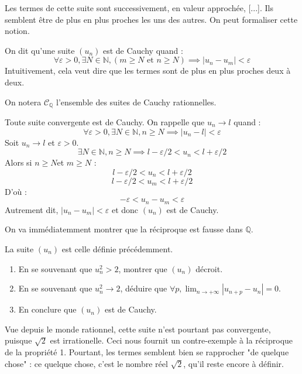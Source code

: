 Les termes de cette suite sont successivement, en valeur approchée, [...]. Ils semblent être de plus en plus proches les uns des autres. On peut formaliser cette notion.

\begin{defini}
On dit qu'une suite $(u_n)$ est de Cauchy quand :
$$\forall \varepsilon > 0, \exists N \in \mathbb{N}, (m \geq N \text{ et } n \geq N) \implies |u_n-u_m| < \varepsilon$$
Intuitivement, cela veut dire que les termes sont de plus en plus proches deux à deux.

On notera $\mathcal{C}_{\mathbb{Q}}$ l'ensemble des suites de Cauchy rationnelles.
\end{defini}

\begin{prop}
Toute suite convergente est de Cauchy.
\tcblower
On rappelle que $u_n \to l$ quand :
$$\forall \varepsilon > 0, \exists N \in \mathbb{N}, n \geq N \implies |u_n-l| < \varepsilon$$
Soit $u_n \to l$ et $\varepsilon > 0$.
$$\exists N \in \mathbb{N}, n \geq N \implies l-\varepsilon/2 < u_n < l+\varepsilon/2$$
Alors si $n \geq N$et $m \geq  N$ :
$$l-\varepsilon/2 < u_n < l+\varepsilon/2$$
$$l-\varepsilon/2 < u_m < l+\varepsilon/2$$
D'où :
$$-\varepsilon < u_n-u_m < \varepsilon$$
Autrement dit, $|u_n-u_m|<\varepsilon$ et donc $(u_n)$ est de Cauchy.
\end{prop}    

On va immédiatemment montrer que la réciproque est fausse dans $\mathbb{Q}$.

\begin{exo}
La suite $(u_n)$ est celle définie précédemment.
\begin{enumerate}[font=\color{blue!50!green}]
\item En se souvenant que $u_n^2>2$, montrer que $(u_n)$ décroit.
\item En se souvenant que $u_n^2 \to 2$, déduire que $\displaystyle\forall p,\lim_{n\to+\infty} |u_{n+p}-u_n| = 0$.
\item En conclure que $(u_n)$ est de Cauchy.
\end{enumerate}
\end{exo}

Vue depuis le monde rationnel, cette suite n'est pourtant pas convergente, puisque $\sqrt{2}$ est irrationelle. Ceci nous fournit un contre-exemple à la réciproque de la propriété 1. 
Pourtant, les termes semblent bien se rapprocher "de quelque chose" : ce quelque chose, c'est le nombre réel $\sqrt{ 2 }$, qu'il reste encore à définir. \label{motiv}

